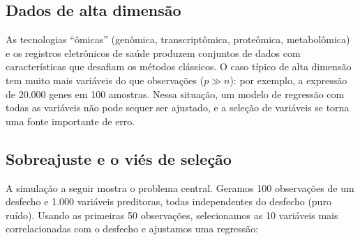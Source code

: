 \documentclass[
]{book}
\begin{document}
\subsection{Dados de alta dimensão}\label{dados-de-alta-dimensuxe3o}

As tecnologias ``ômicas'' (genômica, transcriptômica, proteômica, metabolômica) e os registros eletrônicos de saúde produzem conjuntos de dados com características que desafiam os métodos clássicos. O caso típico de alta dimensão tem muito mais variáveis do que observações (\(p \gg n\)): por exemplo, a expressão de 20.000 genes em 100 amostras. Nessa situação, um modelo de regressão com todas as variáveis não pode sequer ser ajustado, e a seleção de variáveis se torna uma fonte importante de erro.

\subsection{Sobreajuste e o viés de seleção}\label{sobreajuste-e-o-viuxe9s-de-seleuxe7uxe3o}

A simulação a seguir mostra o problema central. Geramos 100 observações de um desfecho e 1.000 variáveis preditoras, todas independentes do desfecho (puro ruído). Usando as primeiras 50 observações, selecionamos as 10 variáveis mais correlacionadas com o desfecho e ajustamos uma regressão:
\end{document}
